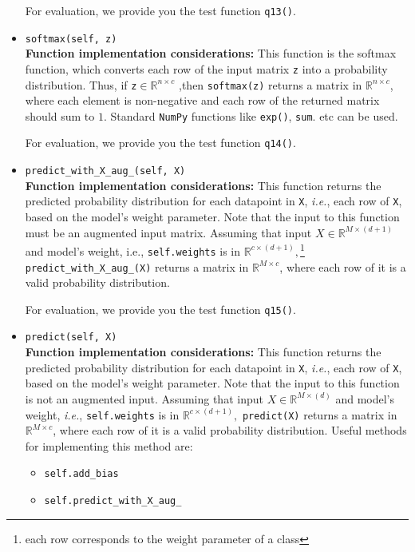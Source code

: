 \documentclass{article}
\theoremstyle{definition}
\begin{document}
\begin{itemize}
{\begin{itemize}
	\end{itemize}
	For evaluation, we provide you the test function \verb|q13()|.}
	\item{\verb|softmax(self, z)|\\\textbf{Function implementation considerations:}
	This function is the softmax function, which converts each row of the input matrix \verb|z| into a probability distribution. Thus, if \verb|z|$\in \mathbb{R}^{n \times c}$ ,then \verb|softmax(z)| returns a matrix in $\mathbb{R}^{n \times c}$, where each element is non-negative and each row of the returned matrix should sum to $1$. Standard \verb|NumPy| functions like \verb|exp()|, \verb|sum|. etc can be used.

	For evaluation, we provide you the test function \verb|q14()|.}
	
	\item{\verb|predict_with_X_aug_(self, X)|\\\textbf{Function implementation considerations:}
		This function returns the predicted probability distribution for each datapoint in \verb|X|, \textit{i.e.}, each row of \verb|X|, based on the model's weight parameter. Note that the input to this function must be an augmented input matrix. Assuming that input $X \in \mathbb{R}^{M \times (d+1)}$ and model's weight, i.e., \verb|self.weights| is in $\mathbb{R}^{c \times (d+1)},$\footnote{each row corresponds to the weight parameter of a class} \verb|predict_with_X_aug_(X)| returns a matrix in $\mathbb{R}^{M \times c}$, where each row of it is a valid probability distribution.
		
		For evaluation, we provide you the test function \verb|q15()|.}
	\item{\verb|predict(self, X)|\\\textbf{Function implementation considerations:}
		This function returns the predicted probability distribution for each datapoint in \verb|X|, \textit{i.e.}, each row of \verb|X|, based on the model's weight parameter. Note that the input to this function is not an augmented input. Assuming that input $X \in \mathbb{R}^{M \times (d)}$ and model's weight, \textit{i.e.}, \verb|self.weights| is in $\mathbb{R}^{c \times (d+1)},$ \verb|predict(X)| returns a matrix in $\mathbb{R}^{M \times c}$, where each row of it is a valid probability distribution. Useful methods for implementing this method are:
		\begin{itemize}
			\item \verb|self.add_bias|
			\item \verb|self.predict_with_X_aug_|
		\end{itemize}
		
}
\end{itemize}
\end{document}
